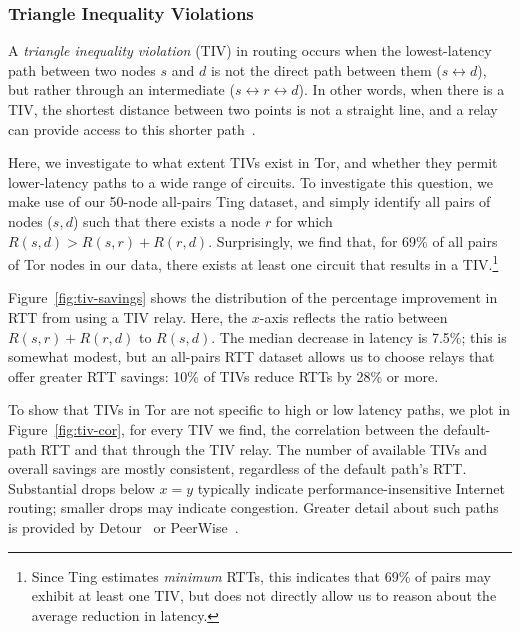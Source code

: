 \subsubsection{Triangle Inequality Violations} %
\label{sec:apps-tivs}

A \emph{triangle inequality violation} (TIV) in routing occurs when the
lowest-latency path between two nodes $s$ and $d$ is not the direct
path between them ($s \leftrightarrow d$), but rather through an
intermediate ($s \leftrightarrow r \leftrightarrow d$).
%
In other words, when there is a TIV, the shortest distance between two
points is not a straight line, and a relay can provide access to this 
shorter path~\cite{detour,peerwise}.  %

Here, we investigate to what extent TIVs exist in Tor, and whether they 
permit lower-latency paths to a wide range of circuits.
%
To investigate this question, we make use of our 50-node all-pairs Ting
dataset, and simply identify all pairs of nodes ($s,d$) such that there
exists a node $r$ for which $R(s,d) > R(s,r) + R(r,d)$.
%
Surprisingly, we find that, for 69\% of all pairs of Tor nodes in
our data, there exists at least one circuit that results in a
TIV.\footnote{Since Ting estimates \emph{minimum} RTTs,
this indicates that 69\% of pairs may exhibit at least one TIV, but
does not directly allow us to reason about the average reduction in
latency.}
  

Figure~\ref{fig:tiv-savings} shows the distribution of the percentage
improvement in RTT from using a TIV relay.
%
Here, the $x$-axis reflects the ratio between $R(s,r) + R(r,d)$ to
$R(s,d)$.
%
The median decrease in latency is 7.5\%; this is somewhat modest, but an
all-pairs RTT dataset allows us to choose relays
that offer greater RTT savings: 10\% of TIVs reduce RTTs by 28\% or more.

To show that TIVs in Tor are not specific to high or low latency paths, 
we plot in Figure~\ref{fig:tiv-cor}, for every TIV we find, the
correlation between the default-path RTT and that through the TIV
relay.
%
The number of available TIVs and overall savings are mostly consistent,
regardless of the default path's RTT\@.
%
Substantial drops below $x=y$ typically indicate
performance-insensitive Internet routing; smaller drops
may indicate congestion.  Greater detail about such paths
is provided by Detour~\cite{detour} or PeerWise~\cite{peerwise}.

%

